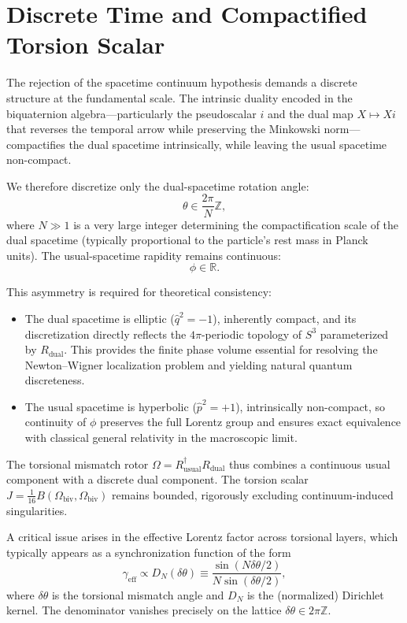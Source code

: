 \documentclass[dvipdfmx,a4paper]{article}
\begin{document}
\section{Discrete Time and Compactified Torsion Scalar}
\label{sec:discretetime}

The rejection of the spacetime continuum hypothesis demands a discrete structure at the fundamental scale. The intrinsic duality encoded in the biquaternion algebra—particularly the pseudoscalar $i$ and the dual map $X \mapsto Xi$ that reverses the temporal arrow while preserving the Minkowski norm—compactifies the dual spacetime intrinsically, while leaving the usual spacetime non-compact.

We therefore discretize only the dual-spacetime rotation angle:
\[
\theta \in \frac{2\pi}{N} \mathbb{Z},
\]
where $N \gg 1$ is a very large integer determining the compactification scale of the dual spacetime (typically proportional to the particle’s rest mass in Planck units). The usual-spacetime rapidity remains continuous:
\[
\phi \in \mathbb{R}.
\]

This asymmetry is required for theoretical consistency:
\begin{itemize}
  \item The dual spacetime is elliptic ($\hat{q}^2 = -1$), inherently compact, and its discretization directly reflects the $4\pi$-periodic topology of $S^3$ parameterized by $R_{\text{dual}}$. This provides the finite phase volume essential for resolving the Newton–Wigner localization problem and yielding natural quantum discreteness.
  \item The usual spacetime is hyperbolic ($\hat{p}^2 = +1$), intrinsically non-compact, so continuity of $\phi$ preserves the full Lorentz group and ensures exact equivalence with classical general relativity in the macroscopic limit.
\end{itemize}

The torsional mismatch rotor $\Omega = R_{\text{usual}}^\dagger R_{\text{dual}}$ thus combines a continuous usual component with a discrete dual component. The torsion scalar $J = \frac{1}{16} B(\Omega_{\text{biv}}, \Omega_{\text{biv}})$ remains bounded, rigorously excluding continuum-induced singularities.

A critical issue arises in the effective Lorentz factor across torsional layers, which typically appears as a synchronization function of the form
\[
\gamma_{\text{eff}} \propto D_N(\delta\theta) \equiv \frac{\sin(N \delta\theta / 2)}{N \sin(\delta\theta / 2)},
\]
where $\delta\theta$ is the torsional mismatch angle and $D_N$ is the (normalized) Dirichlet kernel. The denominator vanishes precisely on the lattice $\delta\theta \in 2\pi \mathbb{Z}$.
\end{document}
